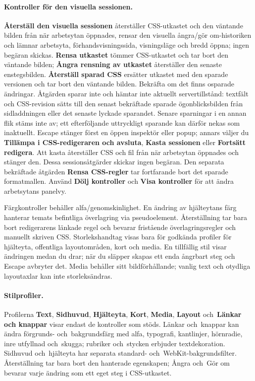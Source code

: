 \documentclass[11pt,a4paper]{article}
\newcommand{\ui}[1]{\textbf{#1}}
\begin{document}
\paragraph{Kontroller för den visuella sessionen.} \ui{Återställ den visuella
sessionen} återställer CSS-utkastet och den väntande bilden från när arbetsytan
öppnades, rensar den visuella ångra/gör om-historiken och lämnar arbetsyta,
förhandsvisningssida, visningsläge och bredd öppna; ingen begäran skickas.
\ui{Rensa utkastet} tömmer CSS-utkastet och tar bort den väntande bilden;
\ui{Ångra rensning av utkastet} återställer den senaste enstegsbilden.
\ui{Återställ sparad CSS} ersätter utkastet med den sparade versionen och tar
bort den väntande bilden. Bekräfta om det finns osparade ändringar. Åtgärden
sparar inte och hämtar inte aktuellt servertillstånd: textfält och CSS-revision
sätts till den senast bekräftade sparade ögonblicksbilden från sidladdningen
eller det senaste lyckade sparandet. Senare sparningar i en annan flik stäms
inte av; ett efterföljande uttryckligt sparande kan därför nekas som inaktuellt.
Escape stänger först en öppen inspektör eller popup; annars väljer du
\ui{Tillämpa i CSS-redigeraren och avsluta}, \ui{Kasta sessionen} eller
\ui{Fortsätt redigera}. Att kasta återställer CSS och fil från när arbetsytan
öppnades och stänger den. Dessa sessionsåtgärder skickar ingen begäran. Den
separata bekräftade åtgärden \ui{Rensa CSS-regler} tar fortfarande bort det
sparade formatmallen. Använd \ui{Dölj kontroller} och \ui{Visa kontroller} för
att ändra arbetsytans panelvy.

Färgkontroller behåller alfa/genomskinlighet. En ändring av hjälteytans färg
hanterar temats befintliga överlagring via pseudoelement. Återställning tar bara
bort redigerarens länkade regel och bevarar fristående överlagringsregler och
manuellt skriven CSS. Storlekshandtag visas bara för godkända profiler för
hjälteyta, offentliga layoutområden, kort och media. En tillfällig stil visar
ändringen medan du drar; när du släpper skapas ett enda ångrbart steg och Escape
avbryter det. Media behåller sitt bildförhållande; vanlig text och otydliga
layoutaxlar kan inte storleksändras.
\paragraph{Stilprofiler.} Profilerna \ui{Text}, \ui{Sidhuvud}, \ui{Hjälteyta},
\ui{Kort}, \ui{Media}, \ui{Layout} och~\ui{Länkar och knappar} visar endast de
kontroller som stöds. Länkar och~knappar kan ändra förgrunds- och~bakgrundsfärg
med alfa, typografi, kantlinjer, hörnradie, inre utfyllnad och~skugga; rubriker
och~stycken erbjuder textdekoration. Sidhuvud och~hjälteyta har separata
standard- och~WebKit-bakgrundsfilter. Återställning tar bara bort den hanterade
egenskapen; Ångra och~Gör om bevarar varje ändring som ett eget steg i
CSS-utkastet.
\end{document}
